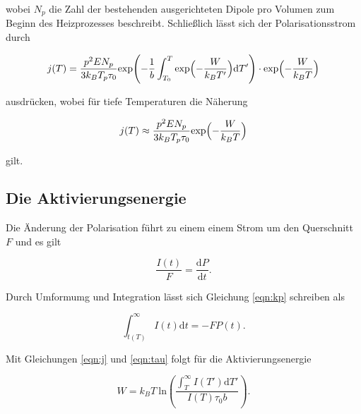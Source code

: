 \noindent
wobei $N_p$ die Zahl der bestehenden ausgerichteten Dipole pro Volumen zum Beginn des Heizprozesses beschreibt.
Schließlich lässt sich der Polarisationsstrom durch

\begin{equation}
    j(T) = \frac{p^2 E N_p}{3 k_B T_p \tau_0} \text{exp} \Biggl(-\frac{1}{b} \int_{T_0}^{T} \text{exp} \Bigl( - \frac{W}{k_B T'} \Bigr) \text{d}T' \Biggr)\cdot 
    \text{exp} \Bigl( - \frac{W}{k_B T} \Bigr)
\end{equation}

\noindent
ausdrücken, wobei für tiefe Temperaturen die Näherung

\begin{equation}
    j(T) \approx \frac{p^2 E N_p}{3 k_B T_p \tau_0} \text{exp} \Bigl( - \frac{W}{k_B T} \Bigr)
    \label{eqn:approx}
\end{equation}

\noindent
gilt.



\subsection{Die Aktivierungsenergie}
Die Änderung der Polarisation führt  zu einem einem Strom um den Querschnitt $F$ und es gilt

\begin{equation}
    \label{eqn:kp}
\frac{I(t)}{F} = \frac{\text{d}P}{\text{d}t}.
\end{equation}

\noindent
Durch Umformumg und Integration lässt sich Gleichung \ref{eqn:kp} schreiben als

\begin{equation}
    \int_{t(T)}^{\infty} I(t) \text{d}t = - F P(t).
    \end{equation}

\noindent
Mit Gleichungen \ref{eqn:j} und \ref{eqn:tau} folgt für die Aktivierungsenergie

\begin{equation}
    \label{eqn:idkwhat}
W= k_B T \:\text{ln} \left( \frac{\int_{T}^{\infty} I(T') \text{d} T'}{I(T) \tau_0 b}\right).
\end{equation}
